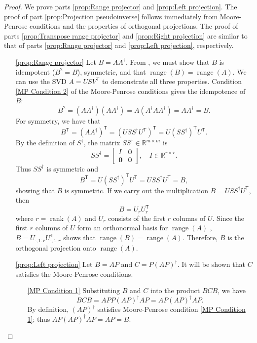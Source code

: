 \documentclass[12pt]{article}
\newcommand{\trans}[1]{{#1}^\mathsf{T}}	%
\newcommand{\pinv}[1]{{#1}^\dagger}	%
\DeclareMathOperator{\rank}{rank}	%
\DeclareMathOperator{\range}{range}	%
\newcommand{\zeroVec}{\bm{0}}	%
\begin{document}
\begin{proof}
We prove parts \ref{prop:Range projector} and \ref{prop:Left projection}. The proof of part \ref{prop:Projection pseudoinverse} follows immediately from Moore-Penrose conditions and the properties of orthogonal projections. The proof of parts \ref{prop:Transpose range projector} and \ref{prop:Right projection} are similar to that of parts \ref{prop:Range projector} and \ref{prop:Left projection}, respectively. 
\begin{enumerate}
    \item[\ref{prop:Range projector}] Let $B = A\pinv{A}$.  From \cite[p.~82]{GolubVanLoan2013}, we must show that $B$ is idempotent ($B^2 = B$), symmetric, and that $\range(B) = \range(A)$. We can use the SVD $A = US\trans{V}$ to demonstrate all three properties. Condition \ref{MP Condition 2} of the Moore-Penrose conditions gives the idempotence of $B$:
    \[B^2 = \left(A\pinv{A}\right)\left(A\pinv{A}\right) = A\left(\pinv{A}A\pinv{A}\right) = A\pinv{A} = B.\]
    For symmetry, we have that
    \[\trans{B} = \trans{\left(A\pinv{A}\right)} = \trans{\left(US\pinv{S}\trans{U}\right)} = U\trans{\left(S\pinv{S}\right)}\trans{U}.\]
    By the definition of $\pinv{S}$, the matrix $S\pinv{S} \in \mathbb{R}^{m \times m}$ is
    \[S\pinv{S} = \begin{bmatrix}
    I & \zeroVec \\
    \zeroVec & \zeroVec
    \end{bmatrix}, \quad I \in \mathbb{R}^{r \times r}.\]
    Thus $S\pinv{S}$ is symmetric and 
    \[\trans{B} = U\trans{\left(S\pinv{S}\right)}\trans{U} = US\pinv{S}\trans{U} = B,\]
    showing that $B$ is symmetric. If we carry out the multiplication $B = US\pinv{S}\trans{U}$, then
    \[B = U_{r}\trans{U}_{r}\]
    where $r = \rank(A)$ and $U_r$ consists of the first $r$ columns of $U$. Since the first $r$ columns of $U$ form an orthonormal basis for $\range(A)$ \cite[p.~340]{Leon2010}, $B = U_{\cdot,1:r}\trans{U}_{\cdot,1:r}$ shows that $\range(B) = \range(A)$. Therefore, $B$ is the orthogonal projection onto $\range(A)$.
    \item[\ref{prop:Left projection}] Let $B = AP$ and $C = P\pinv{\left(AP\right)}$. It will be shown that $C$ satisfies the Moore-Penrose conditions.
    \begin{enumerate}
        \item[\ref{MP Condition 1}] Substituting $B$ and $C$ into the product $BCB$, we have 
        \[BCB = APP\pinv{\left(AP\right)}AP = AP\pinv{\left(AP\right)}AP.\] 
        By definition, $\pinv{\left(AP\right)}$ satisfies Moore-Penrose condition \ref{MP Condition 1}; thus $AP\pinv{\left(AP\right)}AP = AP = B$.

\end{enumerate}
\end{enumerate}
\end{proof}
\end{document}
